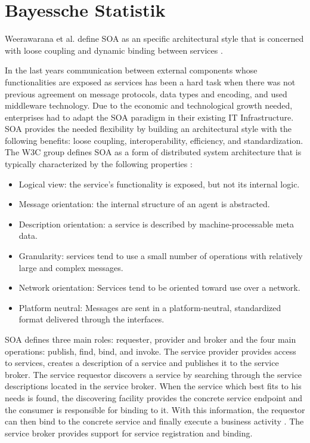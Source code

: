 \section{Bayessche Statistik}
\label{sec:BayesscheStatistik}  

Weerawarana et al. define SOA as an specific architectural style that is concerned with loose coupling and dynamic binding between services \cite{Weera2005}.

In the last years communication between external components whose functionalities are exposed as services has been a hard task when there was not previous agreement on message protocols, data types and encoding, and used middleware technology. Due to the economic and technological growth needed, enterprises had to adapt the \ac{SOA} paradigm in their existing IT Infrastructure. \ac{SOA} provides the needed flexibility by building an architectural style with the following benefits: loose coupling, interoperability, efficiency, and standardization. The W3C group defines SOA as a form of distributed system architecture that is typically characterized by the following properties \cite{w3csoa}:
	\begin{itemize}
		\item Logical view: the service's functionality is exposed, but not its internal logic.
		\item Message orientation: the internal structure of an agent is abstracted.
		\item Description orientation: a service is described by machine-processable meta data.
		\item Granularity: services tend to use a small number of operations with relatively large and complex messages.
		\item Network orientation: Services tend to be oriented toward use over a network.
		\item Platform neutral: Messages are sent in a platform-neutral, standardized format delivered through the interfaces.
	\end{itemize}

\ac{SOA} defines three main roles: requester, provider and broker and the four main operations: publish, find, bind, and invoke. The service provider provides access to services, creates a description of a service and publishes it to the service broker. The service requestor discovers a service by searching through the service descriptions located in the service broker. When the service which best fits to his needs is found, the discovering facility provides the concrete service endpoint and the consumer is responsible for binding to it.  With this information, the requestor can then bind to the concrete service and finally execute a business activity \cite{Weera2005}. The service broker provides support for service registration and binding. 

